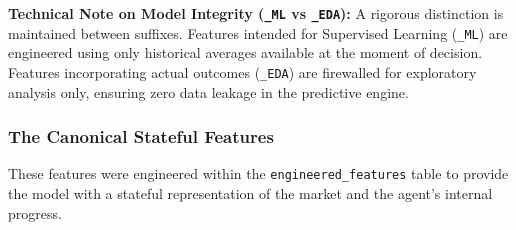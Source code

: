 \vspace{0.3cm}
\noindent \textbf{Technical Note on Model Integrity (\texttt{\_ML} vs \texttt{\_EDA}):}
A rigorous distinction is maintained between suffixes. Features intended for Supervised Learning (\texttt{\_ML}) are engineered using only historical averages available at the moment of decision. Features incorporating actual outcomes (\texttt{\_EDA}) are firewalled for exploratory analysis only, ensuring zero data leakage in the predictive engine.

\subsubsection{The Canonical Stateful Features}
These features were engineered within the \texttt{engineered\_features} table to provide the model with a stateful representation of the market and the agent's internal progress.

